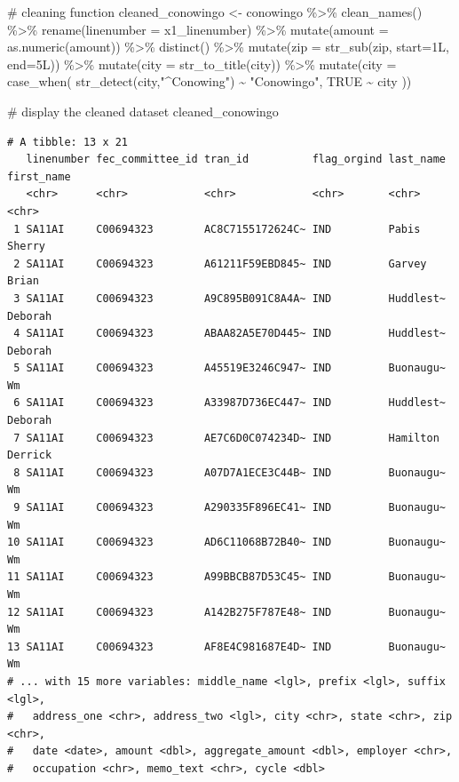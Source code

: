 \documentclass[
  letterpaper,
  DIV=11,
  numbers=noendperiod]{scrreprt}
\newenvironment{Shaded}{\begin{snugshade}}{\end{snugshade}}
\newcommand{\AttributeTok}[1]{\textcolor[rgb]{0.40,0.45,0.13}{#1}}
\newcommand{\CommentTok}[1]{\textcolor[rgb]{0.37,0.37,0.37}{#1}}
\newcommand{\ConstantTok}[1]{\textcolor[rgb]{0.56,0.35,0.01}{#1}}
\newcommand{\FunctionTok}[1]{\textcolor[rgb]{0.28,0.35,0.67}{#1}}
\newcommand{\NormalTok}[1]{\textcolor[rgb]{0.00,0.23,0.31}{#1}}
\newcommand{\OtherTok}[1]{\textcolor[rgb]{0.00,0.23,0.31}{#1}}
\newcommand{\SpecialCharTok}[1]{\textcolor[rgb]{0.37,0.37,0.37}{#1}}
\newcommand{\StringTok}[1]{\textcolor[rgb]{0.13,0.47,0.30}{#1}}
\begin{document}
\begin{Shaded}
\begin{Highlighting}[]
\CommentTok{\# cleaning function}
\NormalTok{cleaned\_conowingo }\OtherTok{\textless{}{-}}\NormalTok{ conowingo }\SpecialCharTok{\%\textgreater{}\%}
  \FunctionTok{clean\_names}\NormalTok{() }\SpecialCharTok{\%\textgreater{}\%} 
  \FunctionTok{rename}\NormalTok{(}\AttributeTok{linenumber =}\NormalTok{ x1\_linenumber) }\SpecialCharTok{\%\textgreater{}\%} 
  \FunctionTok{mutate}\NormalTok{(}\AttributeTok{amount =} \FunctionTok{as.numeric}\NormalTok{(amount)) }\SpecialCharTok{\%\textgreater{}\%} 
  \FunctionTok{distinct}\NormalTok{() }\SpecialCharTok{\%\textgreater{}\%}
  \FunctionTok{mutate}\NormalTok{(}\AttributeTok{zip =} \FunctionTok{str\_sub}\NormalTok{(zip, }\AttributeTok{start=}\NormalTok{1L, }\AttributeTok{end=}\NormalTok{5L)) }\SpecialCharTok{\%\textgreater{}\%}
  \FunctionTok{mutate}\NormalTok{(}\AttributeTok{city =} \FunctionTok{str\_to\_title}\NormalTok{(city)) }\SpecialCharTok{\%\textgreater{}\%}
  \FunctionTok{mutate}\NormalTok{(}\AttributeTok{city =} \FunctionTok{case\_when}\NormalTok{(}
    \FunctionTok{str\_detect}\NormalTok{(city,}\StringTok{"\^{}Conowing"}\NormalTok{) }\SpecialCharTok{\textasciitilde{}} \StringTok{"Conowingo"}\NormalTok{,}
    \ConstantTok{TRUE} \SpecialCharTok{\textasciitilde{}}\NormalTok{ city}
\NormalTok{  ))}
  

\CommentTok{\# display the cleaned dataset}
\NormalTok{cleaned\_conowingo}
\end{Highlighting}
\end{Shaded}

\begin{verbatim}
# A tibble: 13 x 21
   linenumber fec_committee_id tran_id          flag_orgind last_name first_name
   <chr>      <chr>            <chr>            <chr>       <chr>     <chr>     
 1 SA11AI     C00694323        AC8C7155172624C~ IND         Pabis     Sherry    
 2 SA11AI     C00694323        A61211F59EBD845~ IND         Garvey    Brian     
 3 SA11AI     C00694323        A9C895B091C8A4A~ IND         Huddlest~ Deborah   
 4 SA11AI     C00694323        ABAA82A5E70D445~ IND         Huddlest~ Deborah   
 5 SA11AI     C00694323        A45519E3246C947~ IND         Buonaugu~ Wm        
 6 SA11AI     C00694323        A33987D736EC447~ IND         Huddlest~ Deborah   
 7 SA11AI     C00694323        AE7C6D0C074234D~ IND         Hamilton  Derrick   
 8 SA11AI     C00694323        A07D7A1ECE3C44B~ IND         Buonaugu~ Wm        
 9 SA11AI     C00694323        A290335F896EC41~ IND         Buonaugu~ Wm        
10 SA11AI     C00694323        AD6C11068B72B40~ IND         Buonaugu~ Wm        
11 SA11AI     C00694323        A99BBCB87D53C45~ IND         Buonaugu~ Wm        
12 SA11AI     C00694323        A142B275F787E48~ IND         Buonaugu~ Wm        
13 SA11AI     C00694323        AF8E4C981687E4D~ IND         Buonaugu~ Wm        
# ... with 15 more variables: middle_name <lgl>, prefix <lgl>, suffix <lgl>,
#   address_one <chr>, address_two <lgl>, city <chr>, state <chr>, zip <chr>,
#   date <date>, amount <dbl>, aggregate_amount <dbl>, employer <chr>,
#   occupation <chr>, memo_text <chr>, cycle <dbl>
\end{verbatim}
\end{document}
